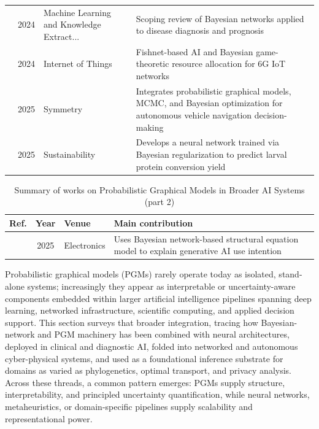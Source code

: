 \begin{table}[!t]
\begin{tabularx}{\textwidth}{@{}l c p{3.6cm} X@{}}
\cite{polotskaya2024bayesian} & 2024 & Machine Learning and Knowledge Extract... & Scoping review of Bayesian networks applied to disease diagnosis and prognosis \\
\cite{ibrahim2024advancing} & 2024 & Internet of Things & Fishnet-based AI and Bayesian game-theoretic resource allocation for 6G IoT networks \\
\cite{abdallah2025advancing} & 2025 & Symmetry & Integrates probabilistic graphical models, MCMC, and Bayesian optimization for autonomous vehicle navigation decision-making \\
\cite{vargasserna2025neural} & 2025 & Sustainability & Develops a neural network trained via Bayesian regularization to predict larval protein conversion yield \\
\bottomrule
\end{tabularx}
\end{table}

\begin{table}[!t]
\centering
\renewcommand{\arraystretch}{1.2}
\caption{Summary of works on Probabilistic Graphical Models in Broader AI Systems (part 2)}
\begin{tabularx}{\textwidth}{@{}l c p{3.6cm} X@{}}
\toprule
\textbf{Ref.} & \textbf{Year} & \textbf{Venue} & \textbf{Main contribution} \\
\midrule
\cite{kim2025understanding} & 2025 & Electronics & Uses Bayesian network-based structural equation model to explain generative AI use intention \\
\bottomrule
\end{tabularx}
\end{table}

Probabilistic graphical models (PGMs) rarely operate today as isolated, stand-alone systems; increasingly they appear as interpretable or uncertainty-aware components embedded within larger artificial intelligence pipelines spanning deep learning, networked infrastructure, scientific computing, and applied decision support. This section surveys that broader integration, tracing how Bayesian-network and PGM machinery has been combined with neural architectures, deployed in clinical and diagnostic AI, folded into networked and autonomous cyber-physical systems, and used as a foundational inference substrate for domains as varied as phylogenetics, optimal transport, and privacy analysis. Across these threads, a common pattern emerges: PGMs supply structure, interpretability, and principled uncertainty quantification, while neural networks, metaheuristics, or domain-specific pipelines supply scalability and representational power.

